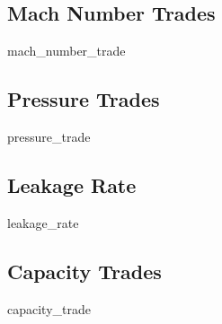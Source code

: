 \subsection{Mach Number Trades}
	{mach_number_trade}
\subsection{Pressure Trades}
	{pressure_trade}
\subsection{Leakage Rate}
	{leakage_rate}
\subsection{Capacity Trades}
	{capacity_trade}